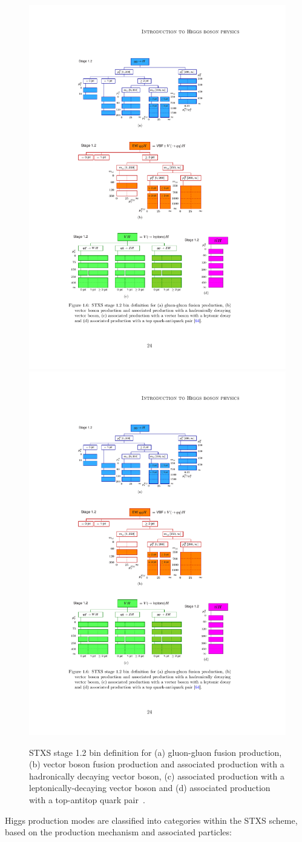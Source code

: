 \begin{figure}[htbp]
    \includegraphics[width=0.6\linewidth]{images/STXSbins_VlepH}\\
    \includegraphics[width=0.25\linewidth]{images/STXSbins_ttH}\\
    \caption{STXS stage 1.2 bin definition for (a) gluon-gluon fusion production, (b) vector boson fusion production and associated production with a hadronically decaying vector boson, (c) associated production with a leptonically-decaying vector boson and (d) associated production with a top-antitop quark pair~\cite{badger2016leshouches2015physics}.}
    \label{fig:STXSbins}
\end{figure}


Higgs production modes are classified into categories within the STXS scheme, based on the production mechanism and associated particles:

